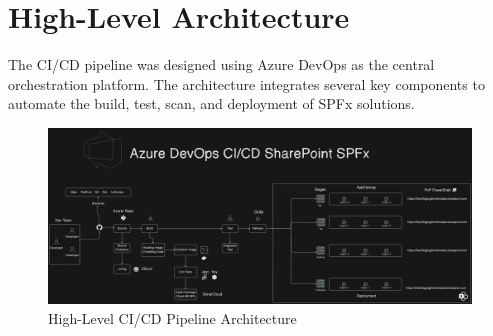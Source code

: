 \section{High-Level Architecture}
\label{sec:HighLevelArchitecture}

The CI/CD pipeline was designed using Azure DevOps as the central orchestration platform. The architecture integrates several key components to automate the build, test, scan, and deployment of SPFx solutions.

\begin{figure}[htbp]
    \centering
    \includegraphics[width=\textwidth]{images/CI-CD.png} %
    \caption{High-Level CI/CD Pipeline Architecture}
    \label{fig:HighLevelArchitecture}
\end{figure}


